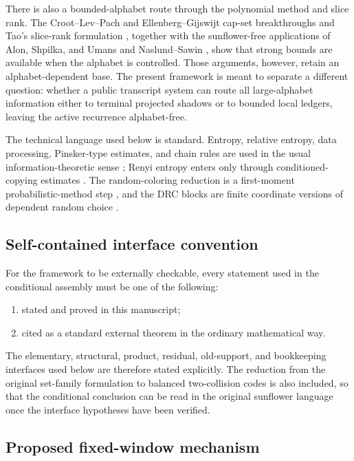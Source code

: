 \documentclass[11pt]{article}
\begin{document}
There is also a bounded-alphabet route through the polynomial method and slice
rank.  The Croot--Lev--Pach and Ellenberg--Gijswijt cap-set breakthroughs
\cite{CLP17,EG17} and Tao's slice-rank formulation \cite{Tao16}, together
with the sunflower-free applications of Alon,
Shpilka, and Umans \cite{ASU13} and Naslund--Sawin \cite{NS17}, show that
strong bounds are available when the alphabet is controlled.  Those arguments,
however, retain an alphabet-dependent base.  The present framework is meant to
separate a different question: whether a public transcript system can route all
large-alphabet information either to terminal projected shadows or to bounded
local ledgers, leaving the active recurrence alphabet-free.

The technical language used below is standard.  Entropy, relative entropy,
data processing, Pinsker-type estimates, and chain rules are used in the
usual information-theoretic sense \cite{Shannon48,KullbackLeibler51,
Pinsker64,CoverThomas06,CsiszarKorner11}; Renyi entropy enters only through
conditioned-copying estimates \cite{Renyi61}.  The random-coloring reduction
is a first-moment probabilistic-method step \cite{AlonSpencer16}, and the DRC
blocks are finite coordinate versions of dependent random choice
\cite{FoxSudakov11}.

\subsection*{Self-contained interface convention}

For the framework to be externally checkable, every statement used in the
conditional assembly must be one of the following:
\begin{enumerate}[label=\textup{(\arabic*)}]
\item stated and proved in this manuscript;
\item cited as a standard external theorem in the ordinary mathematical way.
\end{enumerate}
The elementary, structural, product, residual, old-support, and bookkeeping
interfaces used below are therefore stated explicitly.  The reduction from the
original set-family formulation to balanced two-collision codes is also
included, so that the conditional conclusion can be read in the original
sunflower language once the interface hypotheses have been verified.

\subsection*{Proposed fixed-window mechanism}
\end{document}
